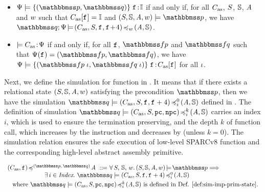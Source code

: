 \begin{definition}
	\label{def:soundness of instruction sequence}
    \mbox{}
    \begin{itemize}
    \item {\em $\semwfseqrel{\Cspec}{\relastP}{\relastQ}{\cblk}$} if and only if, for all
    {\em $C_{\text{as}}$}, $S$, $\mathbb{S}$, $\textit{A}$ and $w$
    such that {\em $C_{\text{as}}[\texttt{f}_{}] = \mathbb{I}$}
    and $(\state, \hpstate, \primcom, \word) \models \relastP$, we have
    {\em $\simInsSeq{\relastQ}{\Cspec}
        {(\asmimp, \state, \lab{}, \lab{}\!+\!4)}{\word}{(\primcom, \hpstate)}$}.
    \item
    $\models C_{\text{as}} \!:\! \Psi$ if and only if, for all
    {\em $\texttt{f}_{}$}, $\relspecpre$ and $\relspecpost$ %
    such that {\em $\Cspec(\lab{}) = (\relspecpre, \relspecpost)$},
    we have {\em $\semwfseqrel{\Cspec}{\relspecpre \; \lgvl}{\relspecpost \; \lgvl}{\asmimp[\lab{}]}$}
    for all $\iota$.
    \end{itemize}
\end{definition}

Next, we define the simulation for function in
\Def{\ref{def:simfunc}}. It means that if there
exists a relational state $(S, \mathbb{S}, \textit{A}, w)$
satisfying the precondition $\relastP$, then we have
the simulation
$\simFunctionSt{\relastQ}{(\asmimp, \state, \lab{}, \lab{} + 4)}
    {i}{0}{(\primcom, \hpstate)}$ defined in
\Def{\ref{def:sim-imp-prim-state}}.
The definition of simulation
$\simFunctionSt{\relastQ}{(\asmimp, \state, \pc, \npc)}
    {i}{k}{(\primcom, \hpstate)}$ carries an index $i$,
which is used to ensure the termination preserving,
and the depth $k$ of function call, which
increases by the \call{} instruction
and decreases by \retl{} (unless $k=0$).
The simulation relation ensures
the safe execution of low-level SPARCv8 function
and the corresponding high-level abstract assembly primitive.

\begin{definition}
    \label{def:simfunc}
    \small
    \em
    \[
        \begin{array}{l}
            \simFunction{(\asmimp, \lab{})}
                {(\relastP, \, \relastQ)}{\primcom}
            \ \define \
            \forall \, \state, \, \hpstate, \, \word. \,
            \asrtmodel{(\state, \hpstate, \primcom, \word)}{\relastP}
            \Longrightarrow \\
            \hspace*{6em}
            \exists \, i \in \Index. \
            \simFunctionSt{\relastQ}{(\asmimp, \state, \lab{}, \lab{}+4)}
                {i}{0}{(\primcom, \hpstate)} \\
            \\[-9pt]
            \hspace*{0.8em}
            \text{where }
            \simFunctionSt{\relastQ}{(\asmimp, \state, \pc, \npc)}
                {i}{k}{(\primcom, \hpstate)}
            \text{ is defined in \Def{\ref{def:sim-imp-prim-state}}}.
        \end{array}
    \]
\end{definition}


